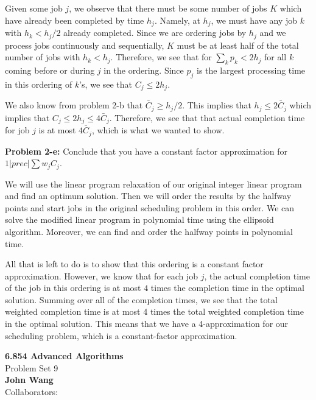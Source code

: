 \documentclass[psamsfonts]{amsart}
\newenvironment{sol}{\vspace{0.25cm}{\large \bfseries Solution:}}{\qedsymbol}
\newenvironment{prob}[1]{\begin{framed}{\large \bfseries Problem #1:}}{\end{framed}}
\newcommand{\makenewtitle}{
    \begin{center}
    {\huge \bfseries 6.854 Advanced Algorithms} \\
    Problem Set 9\\
    \vspace{0.25cm}
    {\bfseries John Wang} \\
    Collaborators:  
    \end{center}
    \vspace{0.5cm}
}
\begin{document}
\begin{sol}
Given some job $j$, we observe that there must be some number of jobs $K$ which have already been completed by time $h_j$. Namely, at $h_j$, we must have any job $k$ with $h_k < h_j/2$ already completed. Since we are ordering jobs by $h_j$ and we process jobs continuously and sequentially, $K$ must be at least half of the total number of jobs with $h_k < h_j$. Therefore, we see that for $\sum_{k} p_k < 2 h_j$ for all $k$ coming before or during $j$ in the ordering. Since $p_j$ is the largest processing time in this ordering of $k$'s, we see that $C_j \leq 2 h_j$. 

We also know from problem 2-b that $\bar{C}_j \geq h_j / 2$. This implies that $h_j \leq 2 \bar{C}_j$ which implies that $C_j \leq 2 h_j \leq 4 \bar{C}_j$. Therefore, we see that that actual completion time for job $j$ is at most $4 \bar{C}_j$, which is what we wanted to show.
\end{sol}

\begin{prob}{2-e}
Conclude that you have a constant factor approximation for $1 | prec | \sum w_j C_j$. 
\end{prob}
\begin{sol}
We will use the linear program relaxation of our original integer linear program and find an optimum solution. Then we will order the results by the halfway points and start jobs in the original scheduling problem in this order. We can solve the modified linear program in polynomial time using the ellipsoid algorithm. Moreover, we can find and order the halfway points in polynomial time. 

All that is left to do is to show that this ordering is a constant factor approximation. However, we know that for each job $j$, the actual completion time of the job in this ordering is at most $4$ times the completion time in the optimal solution. Summing over all of the completion times, we see that the total weighted completion time is at most 4 times the total weighted completion time in the optimal solution. This means that we have a 4-approximation for our scheduling problem, which is a constant-factor approximation.
\end{sol}

\newpage
\makenewtitle
\end{document}
